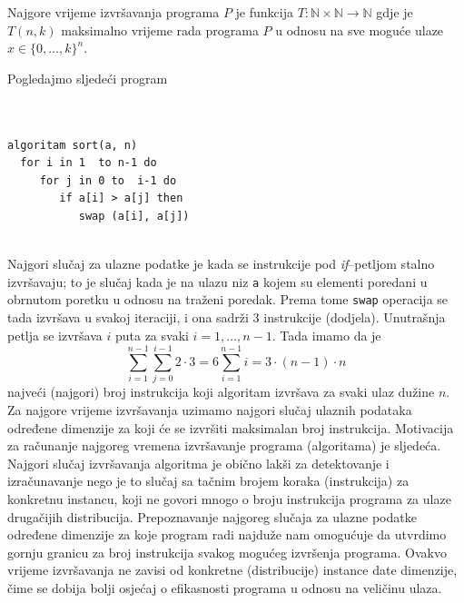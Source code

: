 \begin{definition}
	  Najgore vrijeme izvršavanja programa $P$ je funkcija $T \colon \mathbb{N} \times \mathbb{N} \rightarrow \mathbb{N}$ gdje je $T (n, k)$ maksimalno
	vrijeme rada programa $P$ u odnosu na sve moguće ulaze $x \in  \{0, \ldots , k\}^n$.
\end{definition}

\begin{example} 
	
	Pogledajmo sljedeći program  \\  \vspace{0.3cm} \\
	
\begin{verbatim}

algoritam sort(a, n)
  for i in 1  to n-1 do
     for j in 0 to  i-1 do
        if a[i] > a[j] then
           swap (a[i], a[j])
           
           	\end{verbatim}
\end{example}

Najgori slučaj za ulazne podatke je kada se instrukcije pod \emph{if}--petljom stalno izvršavaju; to je slučaj kada je na ulazu niz \texttt{a} kojem su elementi poredani u obrnutom  poretku u odnosu na traženi poredak. Prema tome \texttt{swap} operacija se tada izvršava u svakoj iteraciji, i ona sadrži 3 instrukcije (dodjela). Unutrašnja petlja se izvršava $i$ puta  za svaki $i=1, \ldots, n-1$.  Tada imamo da je  
$$ \sum_{i=1}^{n-1} \sum_{j=0}^{i-1} 2 \cdot 3 = 6 \sum_{i=1}^{n-1} i = 3 \cdot {(n-1) \cdot n}$$ najveći (najgori) broj instrukcija koji algoritam izvršava za svaki ulaz dužine $n$. 
\\


Za najgore vrijeme izvršavanja  uzimamo najgori slučaj ulaznih podataka određene dimenzije za koji će se izvršiti maksimalan broj instrukcija. Motivacija za računanje najgoreg vremena izvršavanje programa (algoritama) je sljedeća. Najgori slučaj izvršavanja algoritma je obično lakši za detektovanje i izračunavanje nego je to slučaj sa   tačnim brojem koraka (instrukcija) za konkretnu instancu, koji ne govori mnogo o broju instrukcija programa za ulaze drugačijih distribucija. Prepoznavanje najgoreg slučaja za ulazne podatke određene dimenzije za koje program radi najduže nam omogućuje da utvrdimo gornju granicu za broj instrukcija svakog mogućeg izvršenja programa. Ovakvo vrijeme izvršavanja ne zavisi od konkretne (distribucije) instance date dimenzije, čime se dobija bolji osjećaj o efikasnosti programa u odnosu na veličinu ulaza.
 
